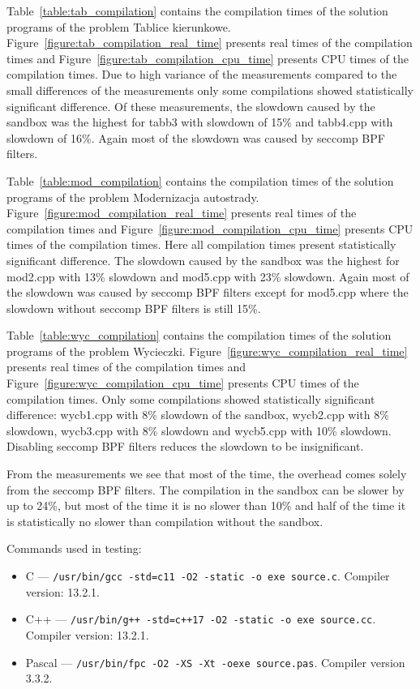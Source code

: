 \documentclass[en]{pracamgr}
\begin{document}
Table~\ref{table:tab_compilation} contains the compilation times of the solution programs of the problem Tablice kierunkowe. Figure~\ref{figure:tab_compilation_real_time} presents real times of the compilation times and Figure~\ref{figure:tab_compilation_cpu_time} presents CPU times of the compilation times. Due to high variance of the measurements compared to the small differences of the measurements only some compilations showed statistically significant difference. Of these measurements, the slowdown caused by the sandbox was the highest for tabb3 with slowdown of 15\% and tabb4.cpp with slowdown of 16\%. Again most of the slowdown was caused by seccomp BPF filters.

Table~\ref{table:mod_compilation} contains the compilation times of the solution programs of the problem Modernizacja autostrady. Figure~\ref{figure:mod_compilation_real_time} presents real times of the compilation times and Figure~\ref{figure:mod_compilation_cpu_time} presents CPU times of the compilation times. Here all compilation times present statistically significant difference. The slowdown caused by the sandbox was the highest for mod2.cpp with 13\% slowdown and mod5.cpp with 23\% slowdown. Again most of the slowdown was caused by seccomp BPF filters except for mod5.cpp where the slowdown without seccomp BPF filters is still 15\%.

Table~\ref{table:wyc_compilation} contains the compilation times of the solution programs of the problem Wycieczki. Figure~\ref{figure:wyc_compilation_real_time} presents real times of the compilation times and Figure~\ref{figure:wyc_compilation_cpu_time} presents CPU times of the compilation times. Only some compilations showed statistically significant difference: wycb1.cpp with 8\% slowdown of the sandbox, wycb2.cpp with 8\% slowdown, wycb3.cpp with 8\% slowdown and wycb5.cpp with 10\% slowdown. Disabling seccomp BPF filters reduces the slowdown to be insignificant.

From the measurements we see that most of the time, the overhead comes solely from the seccomp BPF filters. The compilation in the sandbox can be slower by up to 24\%, but most of the time it is no slower than 10\% and half of the time it is statistically no slower than compilation without the sandbox.

Commands used in testing:
\begin{itemize}
    \item C --- \texttt{/usr/bin/gcc -std=c11 -O2 -static -o exe source.c}. Compiler version: 13.2.1.
    \item C++ --- \texttt{/usr/bin/g++ -std=c++17 -O2 -static -o exe source.cc}. Compiler version: 13.2.1.
    \item Pascal --- \texttt{/usr/bin/fpc -O2 -XS -Xt -oexe source.pas}. Compiler version 3.3.2.
\end{itemize}
\end{document}
